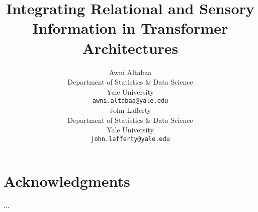\documentclass{article}
\title{Integrating Relational and Sensory Information in Transformer Architectures}
\author{%
  Awni Altabaa\\ %
  Department of Statistics \& Data Science\\
  Yale University\\
  \texttt{awni.altabaa@yale.edu} \\
  \And
  John Lafferty \\
  Department of Statistics \& Data Science \\
  Yale University \\
  \texttt{john.lafferty@yale.edu}
}
\begin{document}
\maketitle
















\section*{Acknowledgments}
...

\printbibliography


\listoffixmes

\clearpage
\newpage


\appendix








\end{document}
